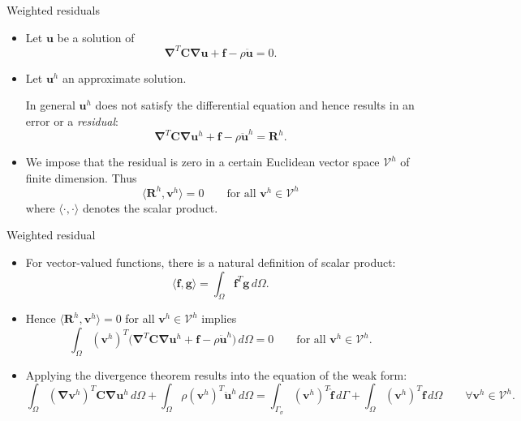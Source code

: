 \documentclass[aspectratio=169]{beamer}
\begin{document}
\begin{frame}{Weighted residuals}
  \begin{itemize}
    \item  Let $\mathbf u$ be a solution of
          $$\boldsymbol\nabla^T\mathbf C\boldsymbol\nabla \mathbf u+\mathbf f-\rho\mathbf{\ddot{u}}=0.$$
    \item Let $\mathbf u^{h}$ an approximate solution.
          \begin{block}{}
            In general $\mathbf u^{h}$ does not satisfy the diﬀerential equation and hence results in an error or a \emph{residual}:
            $$\boldsymbol\nabla^T\mathbf C\boldsymbol\nabla \mathbf u^{h}+\mathbf f-\rho\mathbf{\ddot{u}}^{h}=\mathbf R^{h}.$$
          \end{block}
    \item We impose that the residual is zero in a certain Euclidean vector space $\mathcal V^h$ of finite dimension. Thus
          $$\langle\mathbf R^{h}, \mathbf v^h\rangle=0\qquad \text{for all }\mathbf v^h\in\mathcal V^{h}$$
          where $\langle\cdot,\cdot\rangle$ denotes the scalar product.
  \end{itemize}
\end{frame}

\begin{frame}{Weighted residual}
  \begin{itemize}
    \item For vector-valued functions, there is a natural definition of scalar product:
          $$\langle\mathbf f,\mathbf g\rangle=\int_{\Omega}\mathbf f^{T}\mathbf g\, d\Omega.$$
    \item Hence $\langle\mathbf R^{h}, \mathbf v^h\rangle=0$  for all $\mathbf v^h\in\mathcal V^{h}$ implies
          $$\int_{\Omega}(\mathbf v^h)^{T}\big(\boldsymbol\nabla^T\mathbf C\boldsymbol\nabla \mathbf u^h+\mathbf f-\rho\mathbf{\ddot{u}}^h\big)\, d\Omega=0 \qquad \text{for all }\mathbf v^h\in\mathcal V^{h}.$$
    \item Applying the divergence theorem results into the equation of the weak form:
          $$\int_\Omega (\boldsymbol\nabla \mathbf v^h)^{T} \mathbf C\boldsymbol\nabla \mathbf u^h\, d\Omega+\int_\Omega\rho(\mathbf v^h)^{T}\mathbf{\ddot{u}}^h\, d\Omega=\int_{\Gamma_\sigma} (\mathbf v^h)^{T}\mathbf{\hat f} \, d\Gamma+\int_\Omega (\mathbf v^h)^{T}\mathbf f\, d\Omega \qquad \forall\mathbf v^h\in\mathcal V^{h}.$$
  \end{itemize}
\end{frame}
\end{document}
